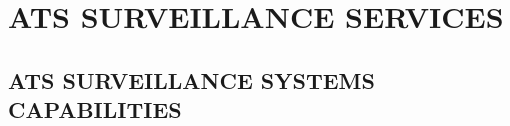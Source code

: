 
\chapterbegin

\section[ATS Surveillance Services]{ATS SURVEILLANCE SERVICES}


\subsection[ATS surveillance systems capabilities]{ATS SURVEILLANCE SYSTEMS CAPABILITIES}

